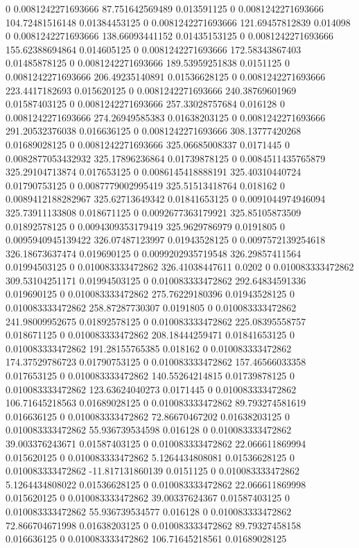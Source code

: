 0 0.0081242271693666 87.751642569489 0.013591125
0 0.0081242271693666 104.72481516148 0.01384453125
0 0.0081242271693666 121.69457812839 0.014098
0 0.0081242271693666 138.66093441152 0.01435153125
0 0.0081242271693666 155.62388694864 0.014605125
0 0.0081242271693666 172.58343867403 0.01485878125
0 0.0081242271693666 189.53959251838 0.0151125
0 0.0081242271693666 206.49235140891 0.01536628125
0 0.0081242271693666 223.4417182693 0.015620125
0 0.0081242271693666 240.38769601969 0.01587403125
0 0.0081242271693666 257.33028757684 0.016128
0 0.0081242271693666 274.26949585383 0.01638203125
0 0.0081242271693666 291.20532376038 0.016636125
0 0.0081242271693666 308.13777420268 0.01689028125
0 0.0081242271693666 325.06685008337 0.0171445
0 0.0082877053432932 325.17896236864 0.01739878125
0 0.0084511435765879 325.29104713874 0.017653125
0 0.0086145418888191 325.40310440724 0.01790753125
0 0.0087779002995419 325.51513418764 0.018162
0 0.0089412188282967 325.62713649342 0.01841653125
0 0.0091044974946094 325.73911133808 0.018671125
0 0.0092677363179921 325.85105873509 0.01892578125
0 0.0094309353179419 325.9629786979 0.0191805
0 0.0095940945139422 326.07487123997 0.01943528125
0 0.0097572139254618 326.18673637474 0.019690125
0 0.0099202935719548 326.29857411564 0.01994503125
0 0.010083333472862 326.41038447611 0.0202
0 0.010083333472862 309.53104251171 0.01994503125
0 0.010083333472862 292.64834591336 0.019690125
0 0.010083333472862 275.76229180396 0.01943528125
0 0.010083333472862 258.87287730307 0.0191805
0 0.010083333472862 241.98009952675 0.01892578125
0 0.010083333472862 225.08395558757 0.018671125
0 0.010083333472862 208.18444259471 0.01841653125
0 0.010083333472862 191.28155765385 0.018162
0 0.010083333472862 174.37529786723 0.01790753125
0 0.010083333472862 157.46566033358 0.017653125
0 0.010083333472862 140.55264214815 0.01739878125
0 0.010083333472862 123.63624040273 0.0171445
0 0.010083333472862 106.71645218563 0.01689028125
0 0.010083333472862 89.793274581619 0.016636125
0 0.010083333472862 72.86670467202 0.01638203125
0 0.010083333472862 55.936739534598 0.016128
0 0.010083333472862 39.003376243671 0.01587403125
0 0.010083333472862 22.066611869994 0.015620125
0 0.010083333472862 5.1264434808081 0.01536628125
0 0.010083333472862 -11.817131860139 0.0151125
0 0.010083333472862 5.1264434808022 0.01536628125
0 0.010083333472862 22.066611869998 0.015620125
0 0.010083333472862 39.00337624367 0.01587403125
0 0.010083333472862 55.936739534577 0.016128
0 0.010083333472862 72.866704671998 0.01638203125
0 0.010083333472862 89.79327458158 0.016636125
0 0.010083333472862 106.71645218561 0.01689028125

